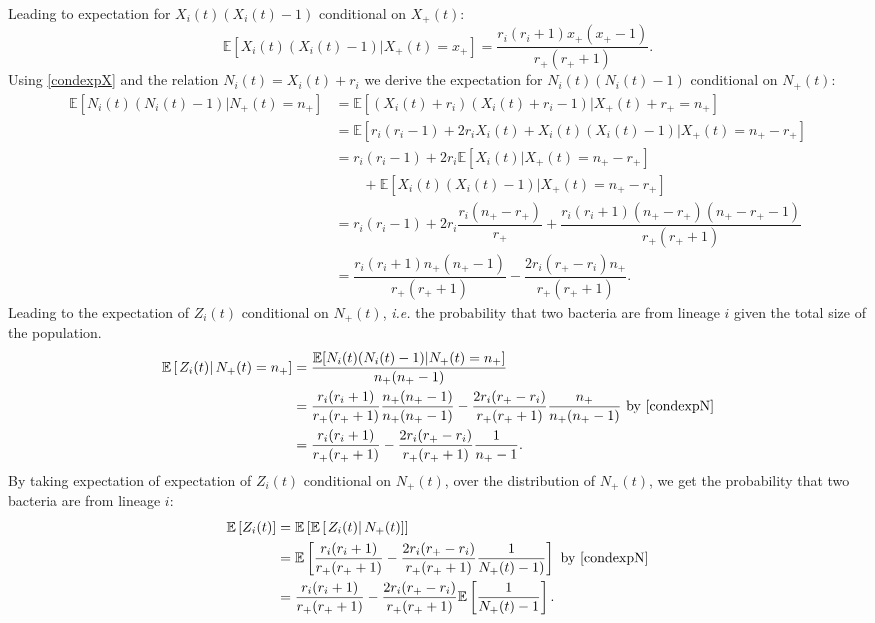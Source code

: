 \documentclass{article}
\begin{document}
Leading to expectation for $X_i(t)(X_i(t)-1)$ conditional on $X_+(t)$:
\begin{equation}
 \mathbb{E} [ X_i(t)(X_i(t)-1) \vert X_+(t)=x_+ ] =\dfrac{r_i(r_i+1) x_+ ( x_+ -1 ) }{r_+ (r_+ +1 )}. \label{condexpX}
\end{equation}
Using \eqref{condexpX} and the relation $N_i(t)=X_i(t)+r_i$ we derive the expectation for $N_i(t)(N_i(t)-1)$ conditional on $N_+(t)$:
\begin{align}
 \mathbb{E} [ N_i(t)(N_i(t)-1) \vert N_+(t)=n_+ ] &= \mathbb{E} [ ( X_i(t)+r_i)(X_i(t)+r_i -1) \vert X_+(t)+ r_+ = n_+ ] \\
 &= \mathbb{E} [r_i(r_i-1) + 2r_i X_i(t) + X_i(t)(X_i(t)-1) \vert X_+(t)=n_+ - r_+ ]\\
 &= r_i(r_i-1) + 2 r_i \mathbb{E} [ X_i(t) \vert X_+(t)=n_+ - r_+ ]\\
 & \qquad + \mathbb{E} [X_i(t)(X_i(t)-1) \vert X_+(t)=n_+ - r_+ ]\\
  &= r_i(r_i-1) + 2 r_i \dfrac{r_i (n_+ - r_+)}{r_+ } + \dfrac{r_i(r_i+1) (n_+ - r_+) ( n_+ - r_+ -1 ) }{r_+ (r_+ +1 )}\\
 &=\dfrac{r_i(r_i+1) n_+ ( n_+ -1 ) }{r_+ (r_+ +1)} -\dfrac{2 r_{i} (r_+ - r_i) n_+ }{r_+ (r_+ +1)}. \label{condexpN}
\end{align}
Leading to the expectation of $Z_i(t)$ conditional on $N_+(t)$, \textit{i.e.} the probability that two bacteria are from lineage $i$ given the total size of the population. 
\begin{align}
  \mathbb{E}\left[ \left. Z_i(t)  \right\vert N_+(t)=n_+ \right] &= 
 \dfrac{\mathbb{E}[ N_i(t)(N_i(t)-1) \vert N_+(t)=n_+] }{n_+ (n_+ -1 ) }  \\
 &=\dfrac{r_i(r_i+1)}{r_+ (r_+ +1)} \dfrac{n_+ (n_+ -1 ) }{ n_+ (n_+ -1 ) }- \dfrac{2 r_i (r_+ -r_{i})}{r_+ (r_+ +1)} \dfrac{n_+}{ n_+ (n_+ -1 ) } \text{ by }\eqref{condexpN}\\
 &=\dfrac{r_i(r_i+1)}{r_+ (r_+ +1)}- \dfrac{2 r_i (r_+ -r_{i})}{r_+ (r_+ +1)} \dfrac{1}{ n_+ -1  }. \label{RelatednesscondexpN}
\end{align}
By taking expectation of expectation of $Z_i(t)$ conditional on $N_+(t)$, over the distribution of $N_+(t)$, we get the probability that two bacteria are from lineage $i$:
\begin{align}
\mathbb{E}\left[ Z_i(t) \right] &= 
 \mathbb{E}\left[ \mathbb{E}\left[ \left. Z_i(t) \right\vert N_+(t) \right] \right]\\
 &=\mathbb{E}\left[\dfrac{r_i(r_i+1)}{r_+ (r_+ +1)}- \dfrac{2 r_i (r_+ -r_{i})}{r_+ (r_+ +1)} \dfrac{1}{N_+(t)-1) } \right] \text{ by }\eqref{condexpN}\\
 &=\dfrac{r_i(r_i+1)}{r_+ (r_+ +1 )}-\dfrac{2 r_i (r_+ -r_{i})}{r_+ (r_+ +1 )}\mathbb{E}\left[\dfrac{1}{N_+(t)-1} \right]. \label{EZi}
\end{align}
\end{document}
